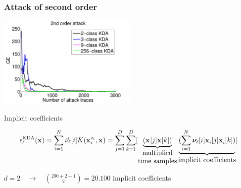 \begin{frame}
\frametitle{Attack of second order}
\vspace{-10pt}
\includegraphics[width=0.5\textwidth]{../Figures/CARDIS2016/2order_classes_TA.pdf} 
\begin{block}{Implicit coefficients}

\begin{equation}
\extract^{\mathrm{KDA}}_{\ell}(\sss[]{}) = \sum_{i=1}^{\NPoI}\nununu_\ell[i]K(\sss[z_i]{i}, \sss[]{})= \sum_{j=1}^\traceLength \sum_{k=1}^\traceLength[ \underbrace{(\sss[]{}[j]\sss[]{}[k])}_{\parbox[c]{2cm}{\centering{multiplied \\ time samples}}}\underbrace{(\sum_{i=1}^{\NPoI}\boldsymbol{\nu}_{\ell}[i] \sss[]{i}[j]\sss[]{i}[k])}_{\mbox{implicit  coefficients}}]
\end{equation}


\end{block}
$d=2 \quad \longrightarrow \quad  {{200+2-1}\choose{2}} = 20.100$ implicit coefficients
\end{frame}

